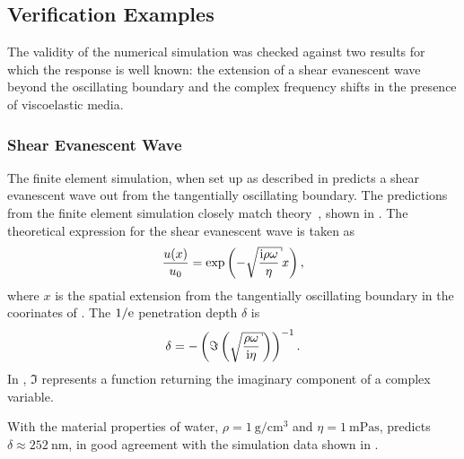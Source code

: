 \subsection{Verification Examples}
The validity of the numerical simulation was checked against two results
for which the response is well known: the extension of a shear evanescent
wave beyond the oscillating boundary and the complex frequency shifts in
the presence of viscoelastic media.

\subsubsection{Shear Evanescent Wave}
The finite element simulation, when set up as described in
 predicts a shear evanescent wave out from
the tangentially oscillating boundary.  The predictions from the finite
element simulation closely match theory~\cite{steinem2007piezoelectric},
shown in .  The theoretical expression for the
shear evanescent wave is taken as~\cite{steinem2007piezoelectric}
\begin{equation}
 \frac{u(x)}{u_0} = \exp\left(-\sqrt{\frac{\mi \rho \omega}{\eta}} x\right),
\end{equation}
where $x$ is the spatial extension from the tangentially oscillating
boundary in the coorinates of .  The $1/{\mathrm{e}}$
penetration depth $\delta$ is
\begin{equation}
 \delta =
 -\left(\Im\left(\sqrt{\frac{\rho\omega}{\mi\eta}}\right)\right)^{-1}.
 \label{eqn:suppshearwavedelta}
\end{equation}
In , $\Im$ represents a function returning
the imaginary component of a complex variable.

With the material properties of water,
$\rho=\SI{1}{\gram\per\centi\meter\cubed}$ and
$\eta=\SI{1}{\milli\pascal\second}$, 
predicts $\delta\approx\SI{252}{\nano\meter}$, in good agreement with the
simulation data shown in .

